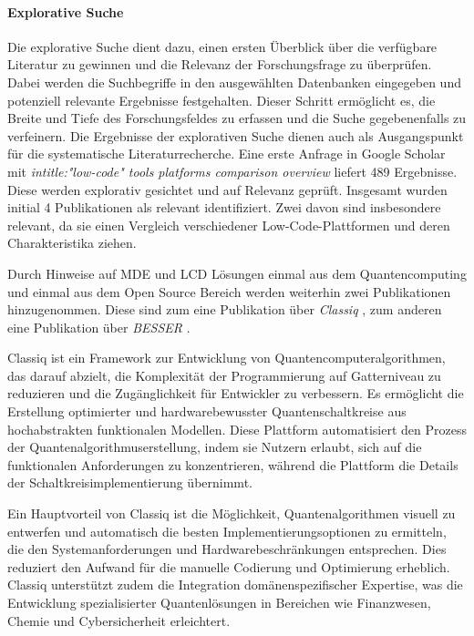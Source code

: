 \paragraph{Explorative Suche}
Die explorative Suche dient dazu, einen ersten Überblick über die verfügbare Literatur zu gewinnen und 
die Relevanz der Forschungsfrage zu überprüfen. Dabei werden die Suchbegriffe in den ausgewählten 
Datenbanken eingegeben und potenziell relevante Ergebnisse festgehalten. Dieser Schritt ermöglicht es, 
die Breite und Tiefe des Forschungsfeldes zu erfassen und die Suche gegebenenfalls zu verfeinern. 
Die Ergebnisse der explorativen Suche dienen auch als Ausgangspunkt für die systematische Literaturrecherche. 
Eine erste Anfrage in Google Scholar mit \textit{intitle:"low-code" tools platforms comparison overview} liefert 489 
Ergebnisse. Diese werden explorativ gesichtet und auf Relevanz geprüft. Insgesamt wurden initial 4 Publikationen 
als relevant identifiziert. Zwei davon sind insbesondere relevant, da sie einen Vergleich verschiedener 
Low-Code-Plattformen und deren Charakteristika ziehen. 

Durch Hinweise auf MDE und LCD Lösungen einmal aus dem Quantencomputing und einmal aus dem Open Source Bereich werden 
weiterhin zwei Publikationen hinzugenommen. Diese sind zum eine Publikation über \textit{Classiq} \cite{minerbi2022quantum}, zum anderen 
eine Publikation über \textit{BESSER} \cite{alfonso2024building}. 

Classiq ist ein Framework zur Entwicklung von Quantencomputeralgorithmen, das darauf abzielt, die Komplexität der Programmierung 
auf Gatterniveau zu reduzieren und die Zugänglichkeit für Entwickler zu verbessern. Es ermöglicht die Erstellung optimierter und 
hardwarebewusster Quantenschaltkreise aus hochabstrakten funktionalen Modellen. Diese Plattform automatisiert den Prozess der 
Quantenalgorithmuserstellung, indem sie Nutzern erlaubt, sich auf die funktionalen Anforderungen zu konzentrieren, während die 
Plattform die Details der Schaltkreisimplementierung übernimmt.

Ein Hauptvorteil von Classiq ist die Möglichkeit, Quantenalgorithmen visuell zu entwerfen und automatisch die besten Implementierungsoptionen 
zu ermitteln, die den Systemanforderungen und Hardwarebeschränkungen entsprechen. Dies reduziert den Aufwand für die manuelle Codierung und 
Optimierung erheblich. Classiq unterstützt zudem die Integration domänenspezifischer Expertise, was die Entwicklung spezialisierter 
Quantenlösungen in Bereichen wie Finanzwesen, Chemie und Cybersicherheit erleichtert.

